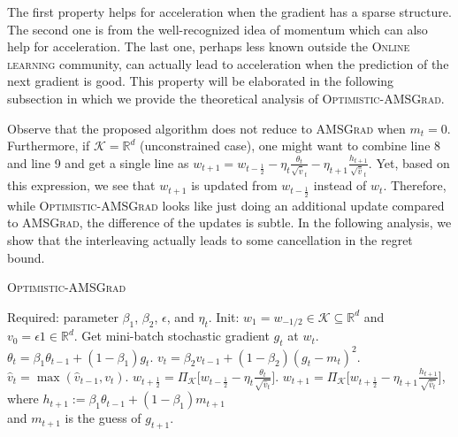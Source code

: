 \documentclass[11pt]{article}
\def\K{\mathcal{K}}
\theoremstyle{k}
\begin{document}
The first property helps for acceleration when the gradient has a sparse structure.
The second one is from the well-recognized idea of momentum which can also help for acceleration. The last one, perhaps less known outside the \textsc{Online learning} community, can actually lead to acceleration when the prediction of the next gradient is good. This property will be elaborated in the following subsection in which we provide the theoretical analysis of \textsc{Optimistic-AMSGrad}.


Observe that the proposed algorithm does not reduce to \textsc{AMSGrad} when $m_{t}=0$.
Furthermore, if $\K = \mathbb R^{d}$ (unconstrained case),
one might want to combine line 8 and line 9 and get a single line as $w_{t+1}=
w_{t-\frac{1}{2}} - \eta_t \frac{\theta_t}{ \sqrt{\hat{v}}_t } - \eta_{t+1} \frac{h_{t+1}}{ \sqrt{\hat{v}}_t }$. Yet,
based on this expression, we see that
$w_{t+1}$ is updated from $w_{t-\frac{1}{2}}$
instead of $w_t$. Therefore, while \textsc{Optimistic-AMSGrad} looks like just doing an additional update compared to \textsc{AMSGrad}, the difference of the updates is subtle.
In the following analysis, we show that the interleaving actually leads to some cancellation in the regret bound.

\begin{algorithm}[t]
\begin{algorithmic}[1] 
\small
\caption{\textsc{Optimistic-AMSGrad}} \label{optadam}
\STATE Required: parameter $\beta_1$, $\beta_2$, $\epsilon$, and $\eta_t$. 
\STATE Init: $w_1 = w_{-1/2} \in \K \subseteq \mathbb R^d $ and $v_{0} = \epsilon 1 \in \mathbb R^{d}$.
\STATE Get mini-batch stochastic gradient $g_t$ at $w_t$.
\STATE $\theta_t = \beta_{1} \theta_{t-1} + (1 - \beta_{1}) g_t$.
\STATE $v_t = \beta_2 v_{t-1} + (1 - \beta_2) (g_t - m_{t})^{2}$.
\STATE $\hat{v}_t = \max( \hat{v}_{t-1} , v_t )$. 
\STATE $w_{t+\frac{1}{2}} = \Pi_{\K}\big[ w_{t-\frac{1}{2}} - \eta_t \frac{\theta_t}{ \sqrt{\hat{v}_t }  } \big]$.
\STATE $w_{t+1} = \Pi_{\K}\big[ w_{t+\frac{1}{2}} - \eta_{t+1} \frac{h_{t+1}}{ \sqrt{\hat{v}_t } } \big]$, %
 \\  
where $h_{t+1}:= \beta_{1} \theta_{t-1} + (1 - \beta_{1}) m_{t+1}$
\\ \qquad and 
$m_{t+1}$ is the guess of $g_{t+1}$. 
\ENDFOR 
\end{algorithmic}
\end{algorithm}
\end{document}
